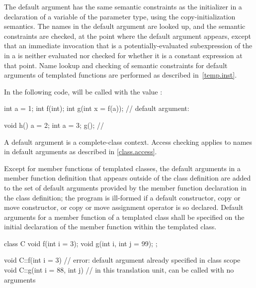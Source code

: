 \pnum
{}%
%
%
The default argument has the
same semantic constraints as the initializer in a
declaration of a variable of the parameter type, using the
copy-initialization semantics.
The names in the
default argument are looked up, and the semantic constraints are checked,
at the point where the default argument appears, except that
an immediate invocation that
is a potentially-evaluated subexpression of
the  in a  is
neither evaluated
nor checked for whether it is a constant expression at that point.
Name lookup and checking of semantic constraints for default
arguments of templated functions are performed as described in~\ref{temp.inst}.
\begin{example}
In the following code,
%
will be called with the value
:

\begin{codeblock}
int a = 1;
int f(int);
int g(int x = f(a));            // default argument: 

void h() {
  a = 2;
  {
    int a = 3;
    g();                        // 
  }
}
\end{codeblock}
\end{example}
\begin{note}
A default argument is a complete-class context.
Access checking applies to names in default arguments as
described in \ref{class.access}.
\end{note}

\pnum
Except for member functions of templated classes, the
default arguments in a member function definition that appears
outside of the class definition
are added to the set of default arguments provided by the
member function declaration in the class definition;
the program is ill-formed if a default constructor,
copy or move constructor, or
copy or move assignment operator
is so declared.
Default arguments for a member function of a templated class
shall be specified on the initial declaration of the member
function within the templated class.
\begin{example}
\begin{codeblock}
class C {
  void f(int i = 3);
  void g(int i, int j = 99);
};

void C::f(int i = 3) {}         // error: default argument already specified in class scope
void C::g(int i = 88, int j) {} // in this translation unit,  can be called with no arguments
\end{codeblock}
\end{example}

